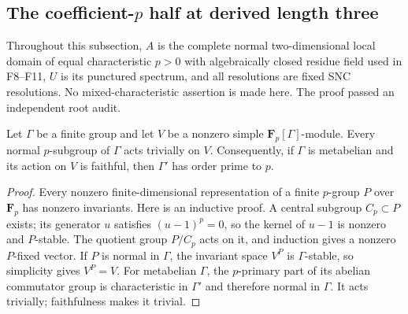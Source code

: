 \subsection{The coefficient-$p$ half at derived length three}

Throughout this subsection, $A$ is the complete normal two-dimensional
local domain of equal characteristic $p>0$ with algebraically closed
residue field used in F8--F11, $U$ is its punctured spectrum, and
all resolutions are fixed SNC resolutions. No mixed-characteristic
assertion is made here. The proof passed an independent root audit.

\begin{lemma}
Let $\Gamma$ be a finite group and let $V$ be a nonzero simple
$\mathbf F_p[\Gamma]$-module. Every normal $p$-subgroup of
$\Gamma$ acts trivially on $V$. Consequently, if $\Gamma$ is
metabelian and its action on $V$ is faithful, then $\Gamma'$ has
order prime to $p$.
\end{lemma}
\begin{proof}
Every nonzero finite-dimensional representation of a finite
$p$-group $P$ over $\mathbf F_p$ has nonzero invariants. Here is an
inductive proof. A central subgroup $C_p\subset P$ exists; its
generator $u$ satisfies $(u-1)^p=0$, so the kernel of $u-1$ is
nonzero and $P$-stable. The quotient group $P/C_p$ acts on it,
and induction gives a nonzero $P$-fixed vector. If $P$ is normal
in $\Gamma$, the invariant space $V^P$ is $\Gamma$-stable, so
simplicity gives $V^P=V$.
For metabelian $\Gamma$, the $p$-primary part of its abelian
commutator group is characteristic in $\Gamma'$ and therefore
normal in $\Gamma$. It acts trivially; faithfulness makes it
trivial.
\end{proof}

